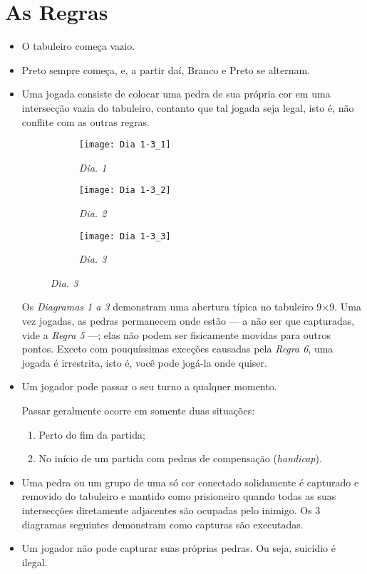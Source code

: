 \chapter{As Regras}\label{chap:regras}

\begin{itemize}
    \item[\textbf{Regra 1}] O tabuleiro começa vazio.
    \item[\textbf{Regra 2}] Preto sempre começa, e, a partir daí, Branco e Preto se alternam. 
    \item[\textbf{Regra 3}] Uma jogada consiste de colocar uma pedra de sua própria cor em uma intersecção vazia do tabuleiro, contanto que tal jogada seja legal, isto é, não conflite com as outras regras.

    \begin{figure}
        \centering
        \begin{subfigure}{.3\textwidth}
            \centering
            \texttt{[image: Dia 1-3\_1]}
            \caption{\emph{Dia. 1}}
        \end{subfigure}
        \begin{subfigure}{.3\textwidth}
            \centering
            \texttt{[image: Dia 1-3\_2]}
            \caption{\emph{Dia. 2}}
        \end{subfigure}
        \begin{subfigure}{.3\textwidth}
            \centering
            \texttt{[image: Dia 1-3\_3]}
            \caption{\emph{Dia. 3}}
        \end{subfigure}
    \end{figure}

    Os \emph{Diagramas 1 a 3} demonstram uma abertura típica no tabuleiro 9\(\times\)9. Uma vez jogadas, as pedras permanecem onde estão --- a não ser que capturadas, vide a \emph{Regra 5} ---; elas não podem ser fisicamente movidas para outros pontos. Exceto com pouquíssimas exceções causadas pela \emph{Regra 6}, uma jogada é irrestrita, isto é, você pode jogá-la onde quiser.
    \item[\textbf{Regra 4}] Um jogador pode passar o seu turno a qualquer momento.
    
    Passar geralmente ocorre em somente duas situações:
        
    \begin{enumerate}
        \item Perto do fim da partida;
        \item No início de um partida com pedras de compensação (\emph{handicap}).
    \end{enumerate}
    \item[\textbf{Regra 5}] Uma pedra ou um grupo de uma só cor conectado solidamente é capturado e removido do tabuleiro e mantido como prisioneiro quando todas as suas intersecções diretamente adjacentes são ocupadas pelo inimigo. Os 3 diagramas seguintes demonstram como capturas são executadas.
    \item[\textbf{Regra 6}] Um jogador não pode capturar suas próprias pedras. Ou seja, suicídio é ilegal.
\end{itemize}

